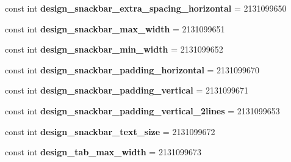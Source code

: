 \begin{DoxyCompactItemize}
\item 
\hypertarget{classClient_1_1Droid_1_1Resource_1_1Dimension_a62cd72a94b9cf8af881f0a74c9b92f91}{}const int {\bfseries design\+\_\+snackbar\+\_\+extra\+\_\+spacing\+\_\+horizontal} = 2131099650\label{classClient_1_1Droid_1_1Resource_1_1Dimension_a62cd72a94b9cf8af881f0a74c9b92f91}

\item 
\hypertarget{classClient_1_1Droid_1_1Resource_1_1Dimension_ac8207594341d1d3aa8c2e280c8b8b64f}{}const int {\bfseries design\+\_\+snackbar\+\_\+max\+\_\+width} = 2131099651\label{classClient_1_1Droid_1_1Resource_1_1Dimension_ac8207594341d1d3aa8c2e280c8b8b64f}

\item 
\hypertarget{classClient_1_1Droid_1_1Resource_1_1Dimension_af1b665c27fc0d9906a2f25aab6d986cb}{}const int {\bfseries design\+\_\+snackbar\+\_\+min\+\_\+width} = 2131099652\label{classClient_1_1Droid_1_1Resource_1_1Dimension_af1b665c27fc0d9906a2f25aab6d986cb}

\item 
\hypertarget{classClient_1_1Droid_1_1Resource_1_1Dimension_ab505ca2d931bd1b723268e24b78c5db4}{}const int {\bfseries design\+\_\+snackbar\+\_\+padding\+\_\+horizontal} = 2131099670\label{classClient_1_1Droid_1_1Resource_1_1Dimension_ab505ca2d931bd1b723268e24b78c5db4}

\item 
\hypertarget{classClient_1_1Droid_1_1Resource_1_1Dimension_ac67c0afa2e8b6c9738082fe1e4d26603}{}const int {\bfseries design\+\_\+snackbar\+\_\+padding\+\_\+vertical} = 2131099671\label{classClient_1_1Droid_1_1Resource_1_1Dimension_ac67c0afa2e8b6c9738082fe1e4d26603}

\item 
\hypertarget{classClient_1_1Droid_1_1Resource_1_1Dimension_addc40709b7d57c9f84212a4b580dc85c}{}const int {\bfseries design\+\_\+snackbar\+\_\+padding\+\_\+vertical\+\_\+2lines} = 2131099653\label{classClient_1_1Droid_1_1Resource_1_1Dimension_addc40709b7d57c9f84212a4b580dc85c}

\item 
\hypertarget{classClient_1_1Droid_1_1Resource_1_1Dimension_aaf0b2b9971bee4b552fe6603fb088551}{}const int {\bfseries design\+\_\+snackbar\+\_\+text\+\_\+size} = 2131099672\label{classClient_1_1Droid_1_1Resource_1_1Dimension_aaf0b2b9971bee4b552fe6603fb088551}

\item 
\hypertarget{classClient_1_1Droid_1_1Resource_1_1Dimension_aadbb8611b6cf8f124defcc95df43c63f}{}const int {\bfseries design\+\_\+tab\+\_\+max\+\_\+width} = 2131099673\label{classClient_1_1Droid_1_1Resource_1_1Dimension_aadbb8611b6cf8f124defcc95df43c63f}


\end{DoxyCompactItemize}
